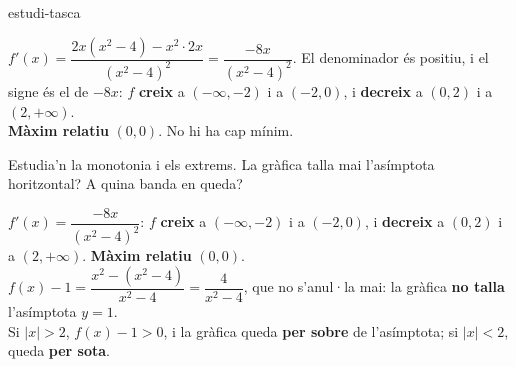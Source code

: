 \begin{apartats}
\begin{tria}{estudi-tasca}
\begin{solucio}
$f'(x)=\dfrac{2x\left(x^2-4\right)-x^2\cdot2x}{\left(x^2-4\right)^2}=\dfrac{-8x}{\left(x^2-4\right)^2}$. El
denominador és positiu, i el signe és el de $-8x$: $f$ \textbf{creix} a $(-\infty,-2)$ i a $(-2,0)$, i
\textbf{decreix} a $(0,2)$ i a $(2,+\infty)$.\\
\textbf{Màxim relatiu} $(0,0)$. No hi ha cap mínim.
\begin{center}
\end{center}
\end{solucio}

Estudia'n la monotonia i els extrems. La gràfica talla mai l'asímptota horitzontal? A quina banda
en queda?

\begin{solucio}
$f'(x)=\dfrac{-8x}{\left(x^2-4\right)^2}$: $f$ \textbf{creix} a $(-\infty,-2)$ i a $(-2,0)$, i
\textbf{decreix} a $(0,2)$ i a $(2,+\infty)$. \textbf{Màxim relatiu} $(0,0)$.\\
$f(x)-1=\dfrac{x^2-\left(x^2-4\right)}{x^2-4}=\dfrac{4}{x^2-4}$, que no s'anul·la mai: la gràfica
\textbf{no talla} l'asímptota $y=1$.\\
Si $|x|>2$, $f(x)-1>0$, i la gràfica queda \textbf{per sobre} de l'asímptota; si $|x|<2$, queda
\textbf{per sota}.
\end{solucio}
\end{tria}

\end{apartats}
